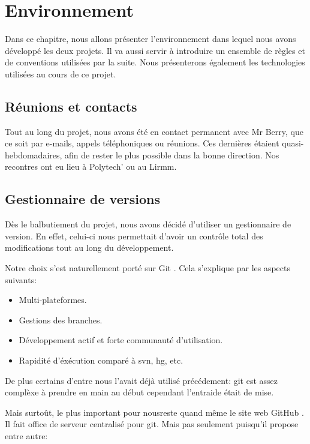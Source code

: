 \chapter{Environnement}

Dans ce chapitre, nous allons présenter l'environnement dans lequel nous avons
développé les deux projets. Il va aussi servir à introduire un ensemble de
règles et de conventions utilisées par la suite.
Nous présenterons également les technologies utilisées au cours de ce projet.

    \section{Réunions et contacts}
Tout au long du projet, nous avons été en contact permanent avec Mr Berry,
que ce soit par e-mails, appels téléphoniques ou réunions. Ces dernières
étaient quasi-hebdomadaires, afin de rester le plus possible dans la
bonne direction. Nos recontres ont eu lieu à Polytech' ou au Lirmm.

    \section{Gestionnaire de versions}
Dès le balbutiement du projet, nous avons décidé d'utiliser un gestionnaire
de version. En effet, celui-ci nous permettait d'avoir un contrôle total des modifications
tout au long du développement.

Notre choix s'est naturellement porté sur Git \cite{git}. Cela s'explique 
par les aspects suivants:

    \begin{itemize}
    \item Multi-plateformes.
    \item Gestions des branches.
    \item Développement actif et forte communauté d'utilisation.
    \item Rapidité d'éxécution comparé à svn, hg, etc. 
    \end{itemize}

    De plus certains d'entre nous l'avait déjà utilisé précédement: git est assez
    complèxe à prendre en main au début cependant l'entraide était de mise.

    Mais surtoût, le plus important pour nousreste quand même le site web GitHub \cite{github}.
    Il fait office de serveur centralisé pour git. Mais pas seulement puisqu'il 
    propose entre autre:

